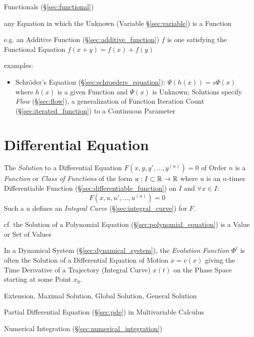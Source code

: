 
Functionals (\S\ref{sec:functional})

any Equation in which the Unknown (Variable \S\ref{sec:variable}) is a Function

e.g. an Additive Function (\S\ref{sec:additive_function}) $f$ is one satisfying
the Functional Equation $f(x + y) = f(x) + f(y)$


examples:
\begin{itemize}
  \item Schr\"oder's Equation (\S\ref{sec:schroeders_equation}): $\Psi(h(x)) =
    s\Psi(x)$ where $h(x)$ is a given Function and $\Psi(x)$ is Unknown;
    Solutions specify \emph{Flow} (\S\ref{sec:flow}), a generalization of
    Function Iteration Count (\S\ref{sec:iterated_function}) to a Continuous
    Parameter
\end{itemize}



\section{Differential Equation}\label{sec:differential_equation}

The \emph{Solution} to a Differential Equation $F(x,y,y',\ldots,y^{(n)}) = 0$
of Order $n$ is a \emph{Function} or \emph{Class of Functions} of the form $u :
I \subset \mathbb{R} \rightarrow \mathbb{R}$ where $u$ is an $n$-times Differentiable
Function (\S\ref{sec:differentiable_function}) on $I$ and $\forall x \in I$:
\[
  F(x,u,u',\ldots,u^{(n)}) = 0
\]
Such a $u$ defines an \emph{Integral Curve} (\S\ref{sec:integral_curve}) for
$F$.

\fist cf. the Solution of a Polynomial Equation
(\S\ref{sec:polynomial_equation}) is a Value or Set of Values

In a Dynamical System (\S\ref{sec:dynamical_system}), the \emph{Evolution
  Function} $\Phi^t$ is often the Solution of a Differential Equation of Motion
$\dot{x} = v(x)$ giving the Time Derivative of a Trajectory (Integral Curve)
$x(t)$ on the Phase Space starting at some Point $x_0$.

Extension, Maximal Solution, Global Solution, General Solution

\fist Partial Differential Equation (\S\ref{sec:pde}) in Multivariable Calculus

\fist Numerical Integration (\S\ref{sec:numerical_integration})


